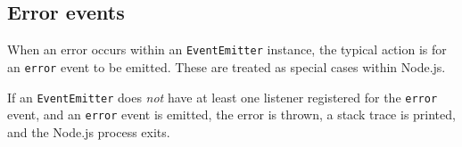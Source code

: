 \subsection{Error events}\label{error-events}

When an error occurs within an \texttt{EventEmitter} instance, the
typical action is for an
\texttt{\textquotesingle{}error\textquotesingle{}} event to be emitted.
These are treated as special cases within Node.js.

If an \texttt{EventEmitter} does \emph{not} have at least one listener
registered for the \texttt{\textquotesingle{}error\textquotesingle{}}
event, and an \texttt{\textquotesingle{}error\textquotesingle{}} event
is emitted, the error is thrown, a stack trace is printed, and the
Node.js process exits.

\begin{Shaded}
\begin{Highlighting}[]
\NormalTok{ \{ }\NormalTok{ \} } \OperatorTok{;}
 \NormalTok{ \{\}}
\OperatorTok{=}  \NormalTok{()}\OperatorTok{;}
\NormalTok{(}\OperatorTok{,}  \NormalTok{(}\NormalTok{))}\OperatorTok{;}
\end{Highlighting}
\end{Shaded}

\begin{Shaded}
\begin{Highlighting}[]
  \OperatorTok{=} \NormalTok{(}\NormalTok{)}\OperatorTok{;}
 \NormalTok{ \{\}}
\OperatorTok{=}  \NormalTok{()}\OperatorTok{;}
\NormalTok{(}\OperatorTok{,}  \NormalTok{(}\NormalTok{))}\OperatorTok{;}
\end{Highlighting}
\end{Shaded}

